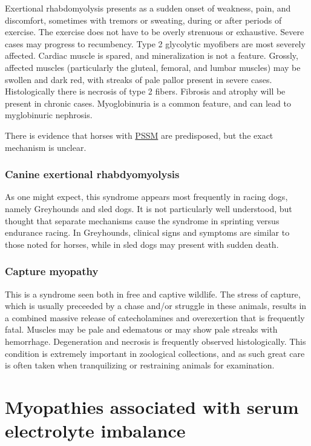 \documentclass[openany]{report}
\begin{document}
Exertional rhabdomyolysis presents as a sudden onset of weakness, pain,
and discomfort, sometimes with tremors or sweating, during or after
periods of exercise. The exercise does not have to be overly strenuous
or exhaustive. Severe cases may progress to recumbency. Type 2
glycolytic myofibers are most severely affected. Cardiac muscle is
spared, and mineralization is not a feature. Grossly, affected muscles
(particularly the gluteal, femoral, and lumbar muscles) may be swollen
and dark red, with streaks of pale pallor present in severe cases.
Histologically there is necrosis of type 2 fibers. Fibrosis and atrophy
will be present in chronic cases. Myoglobinuria is a common feature, and
can lead to myglobinuric nephrosis.

There is evidence that horses with
\protect\hyperlink{equine-polysaccharide-storage-myopathy-pssm}{PSSM}
are predisposed, but the exact mechanism is unclear.

\subsection{Canine exertional
rhabdyomyolysis}\label{canine-exertional-rhabdyomyolysis}

As one might expect, this syndrome appears most frequently in racing
dogs, namely Greyhounds and sled dogs. It is not particularly well
understood, but thought that separate mechanisms cause the syndrome in
sprinting versus endurance racing. In Greyhounds, clinical signs and
symptoms are similar to those noted for horses, while in sled dogs may
present with sudden death.

\subsection{Capture myopathy}\label{capture-myopathy}

This is a syndrome seen both in free and captive wildlife. The stress of
capture, which is usually preceeded by a chase and/or struggle in these
animals, results in a combined massive release of catecholamines and
overexertion that is frequently fatal. Muscles may be pale and edematous
or may show pale streaks with hemorrhage. Degeneration and necrosis is
frequently observed histologically. This condition is extremely
important in zoological collections, and as such great care is often
taken when tranquilizing or restraining animals for examination.

\chapter{Myopathies associated with serum electrolyte
imbalance}\label{myopathies-associated-with-serum-electrolyte-imbalance}
\end{document}
